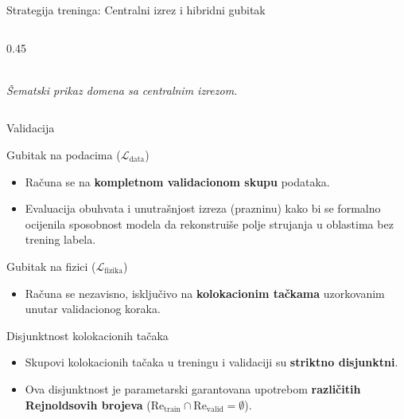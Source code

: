 \documentclass[10pt,aspectratio=169]{beamer}
\begin{document}
\begin{frame}{Strategija treninga: Centralni izrez i hibridni gubitak}
\begin{columns}[T]
\begin{column}{0.45\textwidth}
      \\[2mm]
      {\scriptsize \emph{Šematski prikaz domena sa centralnim izrezom.}}
    \end{column}
  \end{columns}
\end{frame}

\begin{frame}{Validacija}
  \vfill
  \begin{block}{Gubitak na podacima ($\mathcal{L}_{\text{data}}$)}
    \begin{itemize}
      \item Računa se na \textbf{kompletnom validacionom skupu} podataka.
      \item Evaluacija obuhvata i unutrašnjost izreza (prazninu) kako bi se formalno ocijenila sposobnost modela da rekonstruiše polje strujanja u oblastima bez trening labela.
    \end{itemize}
  \end{block}
  
  \vfill
  \begin{block}{Gubitak na fizici ($\mathcal{L}_{\text{fizika}}$)}
    \begin{itemize}
      \item Računa se nezavisno, isključivo na \textbf{kolokacionim tačkama} uzorkovanim unutar validacionog koraka.
    \end{itemize}
  \end{block}
  
  \vfill
  \begin{alertblock}{Disjunktnost kolokacionih tačaka}
    \begin{itemize}
      \item Skupovi kolokacionih tačaka u treningu i validaciji su \textbf{striktno disjunktni}.
      \item Ova disjunktnost je parametarski garantovana upotrebom \textbf{različitih Rejnoldsovih brojeva} ($\mathrm{Re}_{\text{train}} \cap \mathrm{Re}_{\text{valid}} = \emptyset$). 
    \end{itemize}
  \end{alertblock}
\end{frame}
\end{document}

